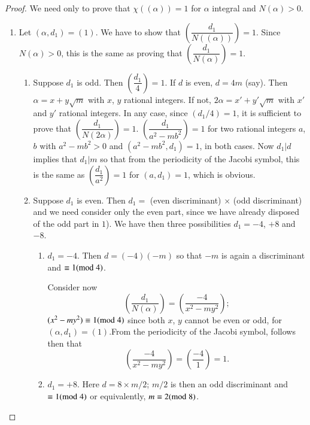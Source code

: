 \begin{proof}
We need only to prove that $\chi((\alpha))=1$ for $\alpha$ integral
and $N(\alpha)>0$.
\begin{enumerate}
\renewcommand{\theenumi}{\alph{enumi}}
\renewcommand{\labelenumi}{(\theenumi)}
\item Let $(\alpha,d_{1})=(1)$. We have to show that
  $\left(\dfrac{d_{1}}{N((\alpha))}\right)=1$. Since $N(\alpha)>0$,
  this is the same as proving that
  $\left(\dfrac{d_{1}}{N(\alpha)}\right)=1$. 
\begin{enumerate}
\renewcommand{\theenumii}{\arabic{enumii}}
\renewcommand{\labelenumii}{(\theenumii)}
\item Suppose $d_{1}$ is odd. Then
  $\left(\dfrac{d_{1}}{4}\right)=1$. If $d$ is even, $d=4m$
  (say). Then $\alpha=x+y\sqrt{m}$ with $x$, $y$ rational integers. If
  not, $2\alpha=x'+y'\sqrt{m}$ with $x'$ and $y'$ rational
  integers. In any case, since $(d_{1}/4)=1$, it is sufficient to
  prove that $\left(\dfrac{d_{1}}{N(2\alpha)}\right)=1$. \ie
  $\left(\dfrac{d_{1}}{a^{2}-mb^{2}}\right)=1$ for two rational
  integers $a$, $b$ with $a^{2}-mb^{2}>0$ and
  $(a^{2}-mb^{2},d_{1})=1$, in both cases. Now $d_{1}|d$ implies that
  $d_{1}|m$ so that from the periodicity of the Jacobi symbol, this is
  the same as $\left(\dfrac{d_{1}}{a^{2}}\right)=1$ for $(a,d_{1})=1$,
  which is obvious.

\item Suppose $d_{1}$ is even. Then $d_{1}=$ (even discriminant)
  $\times$ (odd discriminant) and we need consider only the even part,
  since we have already disposed of the odd part in $1$). We have then
  three possibilities $d_{1}=-4$, $+8$ and $-8$.
\begin{enumerate}
\renewcommand{\theenumiii}{\roman{enumiii}}
\renewcommand{\labelenumiii}{(\theenumiii)}
\item $d_{1}=-4$. Then $d=(-4)(-m)$ so that $-m$ is again a
  discriminant and $\equiv 1(\rm{mod} \; 4)$.

Consider now
$$
\left(\dfrac{d_{1}}{N(\alpha)}\right)=\left(\dfrac{-4}{x^{2}-my^{2}}\right); 
$$
$(x^{2}-my^{2})\equiv 1(\rm{mod} \; 4)$ since both $x$, $y$ cannot be even or
odd, for $(\alpha,d_{1})=(1)$.\pageoriginale From the periodicity of
the Jacobi symbol, follows then that
$$
\left(\frac{-4}{x^{2}-my^{2}}\right)=\left(\frac{-4}{1}\right)=1.
$$

\item $d_{1}=+8$. Here $d=8\times m/2$; $m/2$ is then an odd
  discriminant and $\equiv 1(\rm{mod} \; 4)$ or equivalently, $m\equiv 2(\rm{mod} \;
  8)$. 


\end{enumerate}
\end{enumerate}
\end{enumerate}
\end{proof}

